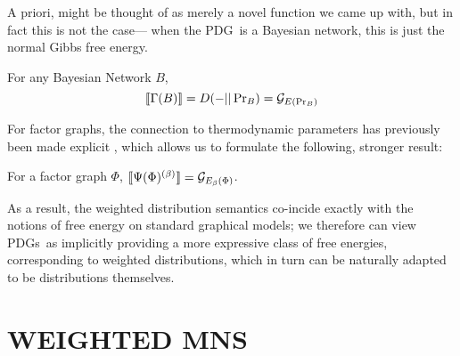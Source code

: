 \documentclass{article}
\newcommand{\MN}{PDG}
\newcommand{\MNs}{\MN s}
\numberwithin{equation}{section}
\begin{document}
\begin{notfocus}
	A priori,  might be thought of as merely a novel function we came up with, but in fact this is not the case--- when the \MN\ is a Bayesian network, this is just the normal Gibbs free energy.

	\begin{prop}\label{prop:bn-free-energy}
		For any Bayesian Network $B$, 
		$$\llbracket\Gamma(B)\rrbracket = D(- || \Pr\nolimits_B) = \mathcal G_{E(\Pr_B)}$$
	\end{prop}
	
	For factor graphs, the connection to thermodynamic parameters has previously been made explicit \parencite{bethe}, which allows us to formulate the following, stronger result:
	
	\begin{conj}\label{thm:fg-free-energy}
		For a factor graph $\Phi$, $\llbracket\Psi(\Phi)^{(\beta)}\rrbracket = \mathcal G_{E_\beta(\Phi)}$.
	\end{conj}

	As a result, the weighted distribution semantics co-incide exactly with the notions of free energy on standard graphical models; we therefore can view \MNs\ as implicitly providing a more expressive class of free energies, corresponding to weighted distributions, which in turn can be naturally adapted to be distributions themselves.
	



	

		
	\section{WEIGHTED MNS}
	

\end{notfocus}
\end{document}
